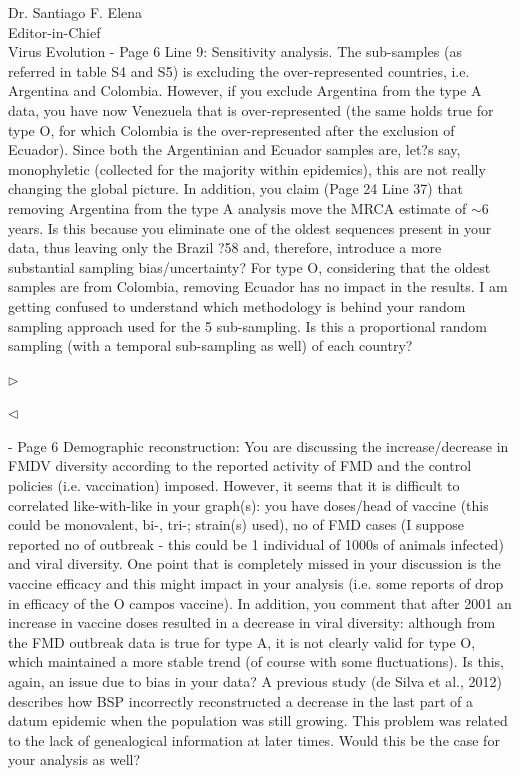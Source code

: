 \documentclass[ucla,biomath,12pt,noaddrfooter,datefrom]{UC_letter}
\newenvironment{reply}{$\triangleright$\bf}{$\triangleleft$}
\begin{document}
\begin{letter}{
Dr. Santiago F. Elena \\
Editor-in-Chief \\
Virus Evolution
}
-       Page 6 Line 9: Sensitivity analysis. 
The sub-samples (as referred in table S4 and S5) is excluding the over-represented countries, i.e. Argentina and Colombia. 
However, if you exclude Argentina from the type A data, you have now Venezuela that is over-represented (the same holds true for type O, for which Colombia is the over-represented after the exclusion of Ecuador). 
Since both the Argentinian and Ecuador samples are, let?s say, monophyletic (collected for the majority within epidemics), this are not really changing the global picture. 
In addition, you claim (Page 24 Line 37) that removing Argentina from the type A analysis move the MRCA estimate of $\sim$6 years. Is this because you eliminate one of the oldest sequences present in your data, thus leaving only the Brazil ?58 and, therefore, introduce a more substantial sampling bias/uncertainty? 
For type O, considering that the oldest samples are from Colombia, removing Ecuador has no impact in the results. 
I am getting confused to understand which methodology is behind your random sampling approach used for the 5 sub-sampling. Is this a proportional random sampling (with a temporal sub-sampling as well) of each country?

\begin{reply}

\end{reply}

-       Page 6 Demographic reconstruction: You are discussing the increase/decrease in FMDV diversity according to the reported activity of FMD and the control policies (i.e. vaccination) imposed. 
However, it seems that it is difficult to correlated like-with-like in your graph(s): you have doses/head of vaccine (this could be monovalent, bi-, tri-; strain(s) used), no of FMD cases (I suppose reported no of outbreak - this could be 1 individual of 1000s of animals infected) and viral diversity. 
One point that is completely missed in your discussion is the vaccine efficacy and this might impact in your analysis (i.e. some reports of drop in efficacy of the O campos vaccine). 
In addition, you comment that after 2001 an increase in vaccine doses resulted in a decrease in viral diversity: although from the FMD outbreak data is true for type A, it is not clearly valid for type O, which maintained a more stable trend (of course with some fluctuations). 
Is this, again, an issue due to bias in your data? A previous study (de Silva et al., 2012) describes how BSP incorrectly reconstructed a decrease in the last part of a datum epidemic when the population was still growing. 
This problem was related to the lack of genealogical information at later times. Would this be the case for your analysis as well?


\end{letter}
\end{document}
